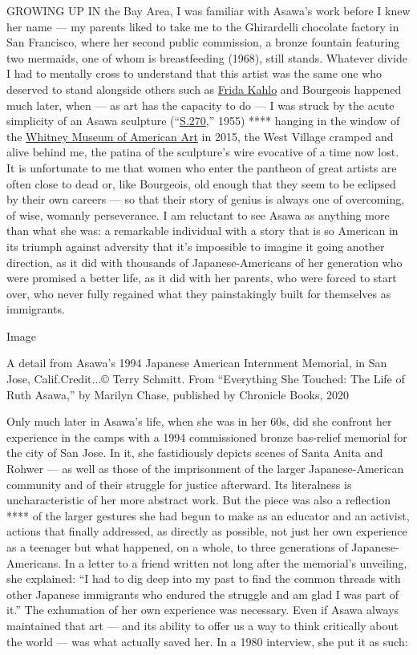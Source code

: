 GROWING UP IN the Bay Area, I was familiar with Asawa's work before I
knew her name --- my parents liked to take me to the Ghirardelli
chocolate factory in San Francisco, where her second public commission,
a bronze fountain featuring two mermaids, one of whom is breastfeeding
(1968), still stands. Whatever divide I had to mentally cross to
understand that this artist was the same one who deserved to stand
alongside others such as
\href{https://www.nytimes3xbfgragh.onion/topic/person/frida-kahlo}{Frida
Kahlo} and Bourgeois happened much later, when --- as art has the
capacity to do --- I was struck by the acute simplicity of an Asawa
sculpture (``\href{https://whitney.org/collection/works/2260}{S.270},''
1955) **** hanging in the window of the
\href{https://www.nytimes3xbfgragh.onion/topic/organization/whitney-museum-of-american-art}{Whitney
Museum of American Art} in 2015, the West Village cramped and alive
behind me, the patina of the sculpture's wire evocative of a time now
lost. It is unfortunate to me that women who enter the pantheon of great
artists are often close to dead or, like Bourgeois, old enough that they
seem to be eclipsed by their own careers --- so that their story of
genius is always one of overcoming, of wise, womanly perseverance. I am
reluctant to see Asawa as anything more than what she was: a remarkable
individual with a story that is so American in its triumph against
adversity that it's impossible to imagine it going another direction, as
it did with thousands of Japanese-Americans of her generation who were
promised a better life, as it did with her parents, who were forced to
start over, who never fully regained what they painstakingly built for
themselves as immigrants.

Image

A detail from Asawa's 1994 Japanese American Internment Memorial, in San
Jose, Calif.Credit...© Terry Schmitt. From ``Everything She Touched: The
Life of Ruth Asawa,'' by Marilyn Chase, published by Chronicle Books,
2020

Only much later in Asawa's life, when she was in her 60s, did she
confront her experience in the camps with a 1994 commissioned bronze
bas-relief memorial for the city of San Jose. In it, she fastidiously
depicts scenes of Santa Anita and Rohwer --- as well as those of the
imprisonment of the larger Japanese-American community and of their
struggle for justice afterward. Its literalness is uncharacteristic of
her more abstract work. But the piece was also a reflection **** of the
larger gestures she had begun to make as an educator and an activist,
actions that finally addressed, as directly as possible, not just her
own experience as a teenager but what happened, on a whole, to three
generations of Japanese-Americans. In a letter to a friend written not
long after the memorial's unveiling, she explained: ``I had to dig deep
into my past to find the common threads with other Japanese immigrants
who endured the struggle and am glad I was part of it.'' The exhumation
of her own experience was necessary. Even if Asawa always maintained
that art --- and its ability to offer us a way to think critically about
the world --- was what actually saved her. In a 1980 interview, she put
it as such:

